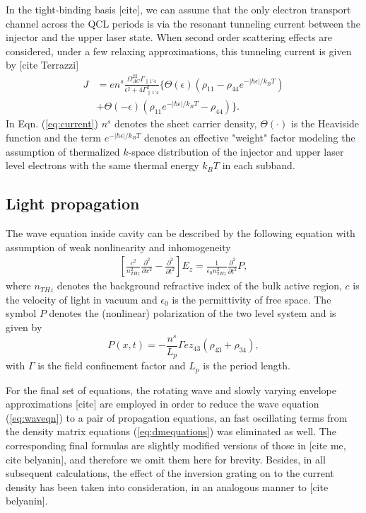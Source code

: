 \documentclass[11pt,final]{scrbook}
\def\p{\partial}
\begin{document}
In the tight-binding basis [cite], we can assume that the only electron transport channel across the QCL periods is via the resonant tunneling current between the injector and the upper laser state. When second order scattering effects are considered, under a few relaxing approximations, this tunneling current is given by [cite Terrazzi]
\begin{align}
\label{eq:current}
J &= en^s\frac{\Omega_{AC}^22\Gamma_{\parallel 1'4}}{\epsilon^2+4\Gamma_{\parallel 1'4}^2}\Big\{\Theta(\epsilon)(\rho_{11}-\rho_{44}e^{-|\hbar\epsilon|/k_BT}) \nonumber \\
&+\Theta(-\epsilon)(\rho_{11}e^{-|\hbar\epsilon|/k_BT}-\rho_{44})\Big\}.
\end{align}
In Eqn. (\ref{eq:current}) $n^s$ denotes the sheet carrier density, $\Theta(\cdot)$ is the Heaviside function and the term $e^{-|\hbar\epsilon|/k_BT}$ denotes an effective "weight" factor modeling the assumption of thermalized $k$-space distribution of the injector and upper laser level electrons with the same thermal energy $k_BT$ in each subband.   

\subsection{Light propagation}
The wave equation inside cavity can be described by the following equation with assumption of weak nonlinearity and inhomogeneity
\begin{align}
\label{eq:waveqn}
\left [\frac{c^2}{n_{THz}^2} \frac{\p^2}{\p x^2} -\frac{\p^2}{\p t^2} \right ] E_z =\frac{1}{\epsilon_0 n_{THz}^2}\frac{\p^2}{\p t^2}P,
\end{align}
where  $n_{THz}$ denotes the background refractive index of the bulk active region, $c$ is the velocity of light in vacuum and $\epsilon_0$ is the permittivity of free space. The symbol $P$ denotes the (nonlinear) polarization of the two level system and is given by 
\begin{equation}
P(x,t) =  -\frac{n^s}{L_p}\Gamma ez_{43} (\rho_{43}+\rho_{34}),  
\end{equation}
with $\Gamma$ is the field confinement factor and $L_p$ is the period length. 

For the final set of equations, the rotating wave and slowly varying envelope approximations [cite] are employed in order to reduce the wave equation (\ref{eq:waveqn}) to a pair of propagation equations, an fast oscillating terms from the density matrix equations (\ref{eq:dmequations}) was eliminated as well. The corresponding final formulas are slightly modified versions of those in [cite me, cite belyanin], and therefore we omit them here for brevity. Besides, in all subsequent calculations, the effect of the inversion grating on to the current density has been taken into consideration, in an analogous manner to [cite belyanin]. 
\end{document}
